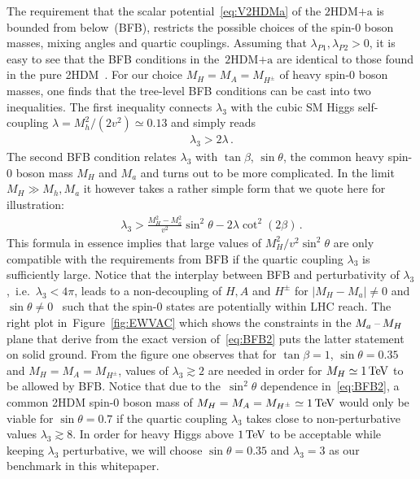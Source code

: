 \documentclass[a4paper, 11pt,notoc]{article}
\newcommand{\hdma}{\ensuremath{\textrm{2HDM+a}}\xspace}
\begin{document}
The requirement that the scalar potential~\eqref{eq:V2HDMa} of the \hdma  is bounded from below~(BFB), restricts the possible choices of the {\color{red} spin-0 boson} masses, mixing angles and quartic couplings. Assuming that $\lambda_{P1}, \lambda_{P2} > 0$, it is easy to see that the  BFB conditions in the~\hdma are identical to those found in the pure 2HDM~\cite{Gunion:2002zf}. For our choice $M_H = M_A = M_{H^\pm}$ of heavy {\color{red} spin-0 boson} masses, one finds that the tree-level BFB conditions can be cast into  two inequalities. The first inequality connects $\lambda_3$ with the cubic SM Higgs self-coupling $\lambda = M_h^2/(2 v^2) \simeq 0.13$ and simply reads   
\begin{align} \label{eq:BFB1}
\lambda_3 > 2 \lambda  \,.
\end{align}
The second BFB condition relates $\lambda_3$ with $\tan \beta$, $\sin \theta$, the common heavy  {\color{red} spin-0 boson}  mass $M_H$ and $M_a$ and turns out to be more complicated. In the limit $M_H \gg M_h, M_a$ it however takes a rather simple form that we quote here for illustration: 
\begin{align} \label{eq:BFB2}
\lambda_3 > \frac{M_H^2 -M_a^2}{v^2} \sin^2 \theta  - 2 \lambda \cot^2 (2 \beta )  \,.
\end{align}
This formula in essence  implies that large values of $M_H^2/v^2 \sin^2 \theta$ are only compatible with the requirements from BFB if the quartic coupling $\lambda_3$ is sufficiently large.  Notice that the interplay between BFB and perturbativity of $\lambda_3$,~i.e.~$\lambda_3 < 4 \pi$, leads to a non-decoupling of $H, A$ and $H^\pm$ for $|M_H - M_a| \neq 0$ and $\sin \theta  \neq 0$~\cite{Goncalves:2016iyg} such that the spin-0 states are potentially within LHC reach. The right plot in~Figure~\ref{fig:EWVAC} which shows the constraints in the $M_{a}\hspace{0.5mm}$--$\hspace{0.5mm} M_H$ plane that derive from the exact version of~\eqref{eq:BFB2} puts the latter statement on solid ground. From the figure one observes that for $\tan \beta = 1$, $\sin \theta = 0.35$ and $M_H = M_A = M_{H^\pm}$, values of $\lambda_3 \gtrsim 2$ are needed in order for $M_H \simeq 1 \, {\rm TeV}$ to be allowed by BFB.  {\color{blue} Notice that due to the~$\sin^2 \theta$ dependence in~\eqref{eq:BFB2},   a common 2HDM  {\color{red} spin-0 boson}  mass of $M_H = M_A = M_{H^\pm} \simeq 1 \, {\rm TeV}$ would only be viable for $\sin \theta = 0.7$ if the quartic coupling $\lambda_3$ takes close to non-perturbative values $\lambda_3 \gtrsim 8$.} In order for heavy Higgs above $1 \, {\rm TeV}$ to be acceptable while keeping $\lambda_3$ perturbative, we will choose $\sin \theta = 0.35$ and $\lambda_3 = 3$ as our benchmark in this whitepaper.  
\end{document}
